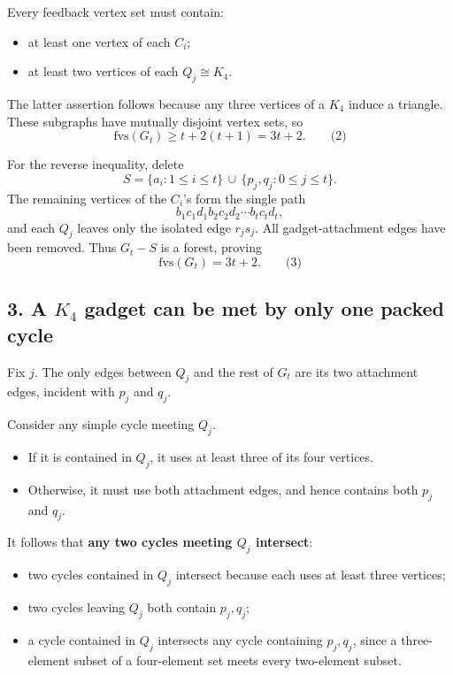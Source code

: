\documentclass[
  11pt,
  a4paper,
]{article}
\providecommand{\tightlist}{%
  \setlength{\itemsep}{0pt}\setlength{\parskip}{0pt}}
\begin{document}
Every feedback vertex set must contain:

\begin{itemize}
\tightlist
\item
  at least one vertex of each \(C_i\);
\item
  at least two vertices of each \(Q_j\cong K_4\).
\end{itemize}

The latter assertion follows because any three vertices of a \(K_4\)
induce a triangle. These subgraphs have mutually disjoint vertex sets,
so \[
\mathrm{fvs}(G_t)\ge t+2(t+1)=3t+2. \qquad\text{(2)}
\]

For the reverse inequality, delete \[
S=\{a_i:1\le i\le t\}
  \,\cup\,
  \{p_j,q_j:0\le j\le t\}.
\] The remaining vertices of the \(C_i\)'s form the single path \[
b_1c_1d_1b_2c_2d_2\cdots b_tc_td_t,
\] and each \(Q_j\) leaves only the isolated edge \(r_js_j\). All
gadget-attachment edges have been removed. Thus \(G_t-S\) is a forest,
proving \[
\boxed{\mathrm{fvs}(G_t)=3t+2.} \qquad\text{(3)}
\]

\subsection{\texorpdfstring{3. A \(K_4\) gadget can be met by only one
packed
cycle}{3. A K\_4 gadget can be met by only one packed cycle}}\label{a-k_4-gadget-can-be-met-by-only-one-packed-cycle}

Fix \(j\). The only edges between \(Q_j\) and the rest of \(G_t\) are
its two attachment edges, incident with \(p_j\) and \(q_j\).

Consider any simple cycle meeting \(Q_j\).

\begin{itemize}
\tightlist
\item
  If it is contained in \(Q_j\), it uses at least three of its four
  vertices.
\item
  Otherwise, it must use both attachment edges, and hence contains both
  \(p_j\) and \(q_j\).
\end{itemize}

It follows that \textbf{any two cycles meeting \(Q_j\) intersect}:

\begin{itemize}
\tightlist
\item
  two cycles contained in \(Q_j\) intersect because each uses at least
  three vertices;
\item
  two cycles leaving \(Q_j\) both contain \(p_j,q_j\);
\item
  a cycle contained in \(Q_j\) intersects any cycle containing
  \(p_j,q_j\), since a three-element subset of a four-element set meets
  every two-element subset.
\end{itemize}
\end{document}
